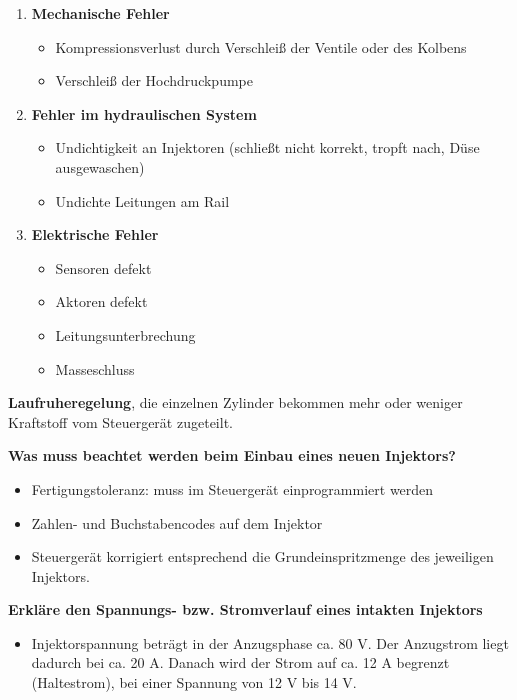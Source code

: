 \begin{enumerate}
\item
  \textbf{Mechanische Fehler}

  \begin{itemize}
  \item
    Kompressionsverlust durch Verschleiß der Ventile oder des Kolbens
  \item
    Verschleiß der Hochdruckpumpe
  \end{itemize}
\item
  \textbf{Fehler im hydraulischen System}

  \begin{itemize}
  \item
    Undichtigkeit an Injektoren (schließt nicht korrekt, tropft nach,
    Düse ausgewaschen)
  \item
    Undichte Leitungen am Rail
  \end{itemize}
\item
  \textbf{Elektrische Fehler}

  \begin{itemize}
  \item
    Sensoren defekt
  \item
    Aktoren defekt
  \item
    Leitungsunterbrechung
  \item
    Masseschluss
  \end{itemize}
\end{enumerate}

\textbf{Laufruheregelung}, die einzelnen Zylinder bekommen mehr oder
weniger Kraftstoff vom Steuergerät zugeteilt.

\textbf{Was muss beachtet werden beim Einbau eines neuen Injektors?}

\begin{itemize}
\item
  Fertigungstoleranz: muss im Steuergerät einprogrammiert werden
\item
  Zahlen- und Buchstabencodes auf dem Injektor
\item
  Steuergerät korrigiert entsprechend die Grundeinspritzmenge des
  jeweiligen Injektors.
\end{itemize}

\textbf{Erkläre den Spannungs- bzw. Stromverlauf eines intakten
Injektors}

\begin{itemize}
\item
  Injektorspannung beträgt in der Anzugsphase ca. 80 V. Der Anzugstrom
  liegt dadurch bei ca. 20 A. Danach wird der Strom auf ca. 12 A
  begrenzt (Haltestrom), bei einer Spannung von 12 V bis 14 V.
\end{itemize}

